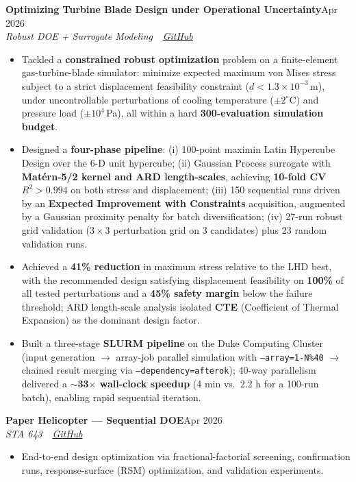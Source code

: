 \documentclass[11pt,letterpaper]{article}
\newcommand{\entry}[4]{%
  \noindent\textbf{\color{ink}#1}\hfill{\color{soft}\small #3}\\[1pt]%
  \textit{\color{muted}#2}\hfill\textit{\color{soft}\small #4}%
  \vspace{2pt}%
}
\begin{document}
\vspace{4pt}
\entry{Optimizing Turbine Blade Design under Operational Uncertainty}{Robust DOE + Surrogate Modeling \,\textbar\, \href{https://github.com/cedricshan/Optimizing-Turbine-Blade-Design}{GitHub}}{Apr 2026}{}
\begin{itemize}
  \item Tackled a \textbf{constrained robust optimization} problem on a finite-element gas-turbine-blade simulator: minimize expected maximum von Mises stress subject to a strict displacement feasibility constraint ($d < 1.3\times10^{-3}$\,m), under uncontrollable perturbations of cooling temperature ($\pm 2^{\circ}\text{C}$) and pressure load ($\pm 10^4$\,Pa), all within a hard \textbf{300-evaluation simulation budget}.
  \item Designed a \textbf{four-phase pipeline}: (i) 100-point maximin Latin Hypercube Design over the 6-D unit hypercube; (ii) Gaussian Process surrogate with \textbf{Mat\'ern-5/2 kernel and ARD length-scales}, achieving \textbf{10-fold CV $R^{2}>0.994$} on both stress and displacement; (iii) 150 sequential runs driven by an \textbf{Expected Improvement with Constraints} acquisition, augmented by a Gaussian proximity penalty for batch diversification; (iv) 27-run robust grid validation ($3\times3$ perturbation grid on 3 candidates) plus 23 random validation runs.
  \item Achieved a \textbf{41\% reduction} in maximum stress relative to the LHD best, with the recommended design satisfying displacement feasibility on \textbf{100\%} of all tested perturbations and a \textbf{45\% safety margin} below the failure threshold; ARD length-scale analysis isolated \textbf{CTE} (Coefficient of Thermal Expansion) as the dominant design factor.
  \item Built a three-stage \textbf{SLURM pipeline} on the Duke Computing Cluster (input generation $\rightarrow$ array-job parallel simulation with \texttt{--array=1-N\%40} $\rightarrow$ chained result merging via \texttt{--dependency=afterok}); 40-way parallelism delivered a \textbf{$\sim$33$\times$ wall-clock speedup} (4 min vs.\ 2.2 h for a 100-run batch), enabling rapid sequential iteration.
\end{itemize}

\vspace{4pt}
\entry{Paper Helicopter --- Sequential DOE}{STA 643 \,\textbar\, \href{https://github.com/cedricshan/Paper-Helicopter-DOE}{GitHub}}{Apr 2026}{}
\begin{itemize}
  \item End-to-end design optimization via fractional-factorial screening, confirmation runs, response-surface (RSM) optimization, and validation experiments.
\end{itemize}
\end{document}
